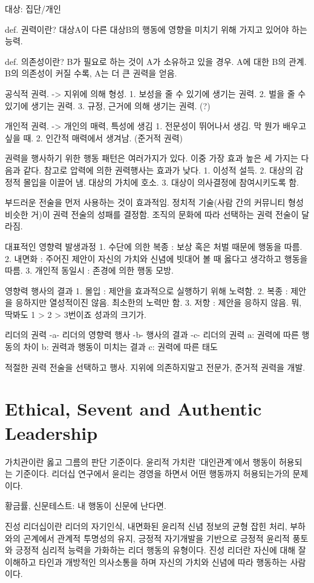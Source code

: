 대상: 집단/개인

def. 권력이란? 대상A이 다른 대상B의 행동에 영향을 미치기 위해 가지고 있어야 하는 능력.

def. 의존성이란? B가 필요로 하는 것이 A가 소유하고 있을 경우. A에 대한 B의 관계.
B의 의존성이 커질 수록, A는 더 큰 권력을 얻음.

공식적 권력. -> 지위에 의해 형성.
  1. 보성을 줄 수 있기에 생기는 권력.
  2. 벌을 줄 수 있기에 생기는 권력.
  3. 규정, 근거에 의해 생기는 권력. (?)

개인적 권력. -> 개인의 매력, 특성에 생김
  1. 전문성이 뛰어나서 생김. 막 뭔가 배우고 싶을 때.
  2. 인간적 매력에서 생겨남. (준거적 권력)

권력을 행사하기 위한 행동 패턴은 여러가지가 있다. 이중 가장 효과 높은 세 가지는 다음과 같다. 
참고로 압력에 의한 권력행사는 효과가 낮다.
  1. 이성적 설득.
  2. 대상의 감정적 몰입을 이끌어 냄. 대상의 가치에 호소.
  3. 대상이 의사결정에 참여시키도록 함.

부드러운 전술을 먼저 사용하는 것이 효과적임.
정치적 기술(사람 간의 커뮤니티 형성 비슷한 거)이 권력 전술의 성패를 결정함.
조직의 문화에 따라 선택하는 권력 전술이 달라짐.

대표적인 영향력 발생과정
1. 수단에 의한 복종 : 보상 혹은 처벌 때문에 행동을 따름.
2. 내면화 : 주어진 제안이 자신의 가치와 신념에 빗대어 볼 때 옳다고 생각하고 행동을 따름.
3. 개인적 동일시 : 존경에 의한 행동 모방.

영향력 행사의 결과
1. 몰입 : 제안을 효과적으로 실행하기 위해 노력함.
2. 복종 : 제안을 응하지만 열성적이진 않음. 최소한의 노력만 함.
3. 저항 : 제안을 응하지 않음.
뭐, 딱봐도 1 > 2 > 3번이죠 성과의 크기가.

리더의 권력 -a- 리더의 영향력 행사 -b- 행사의 결과 -c- 리더의 권력
a: 권력에 따른 행동의 차이
b: 권력과 행동이 미치는 결과
c: 권력에 따른 태도

적절한 권력 전술을 선택하고 행사.
지위에 의존하지말고 전문가, 준거적 권력을 개발.

\section{Ethical, Sevent and Authentic Leadership}

가치관이란 옳고 그름의 판단 기준이다. 윤리적 가치란 '대인관계'에서 행동이
허용되는 기준이다. 리더십 연구에서 윤리는 경영을 하면서 어떤 행동까지
허용되는가의 문제이다.

황금률, 신문테스트: 내 행동이 신문에 난다면.

진성 리더십이란 리더의 자기인식, 내면화된 윤리적 신념 정보의 균형 잡힌 처리,
부하와의 곤계에서 관계적 투명성의 유지, 긍정적 자기개발을 기반으로 긍정적 윤리적
풍토와 긍정적 심리적 능력을 가화하는 리더 행동의 유형이다. 진성 리더란 자신에
대해 잘 이해하고 타인과 개방적인 의사소통을 하며 자신의 가치와 신념에 따라
행동하는 사람이다.

